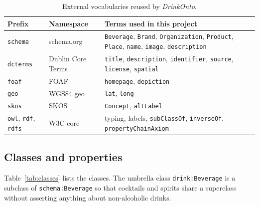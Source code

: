 \begin{table}[h]
  \centering
  \small
  \begin{tabular}{@{}llp{7.2cm}@{}}
    \toprule
    Prefix & Namespace & Terms used in this project \\
    \midrule
    \texttt{schema} & schema.org & \texttt{Beverage}, \texttt{Brand},
      \texttt{Organization}, \texttt{Product}, \texttt{Place},
      \texttt{name}, \texttt{image}, \texttt{description} \\
    \texttt{dcterms} & Dublin Core Terms & \texttt{title},
      \texttt{description}, \texttt{identifier}, \texttt{source},
      \texttt{license}, \texttt{spatial} \\
    \texttt{foaf} & FOAF & \texttt{homepage}, \texttt{depiction} \\
    \texttt{geo} & WGS84 geo & \texttt{lat}, \texttt{long} \\
    \texttt{skos} & SKOS & \texttt{Concept}, \texttt{altLabel} \\
    \texttt{owl}, \texttt{rdf}, \texttt{rdfs} & W3C core & typing, labels,
      \texttt{subClassOf}, \texttt{inverseOf}, \texttt{propertyChainAxiom} \\
    \bottomrule
  \end{tabular}
  \caption{External vocabularies reused by \emph{DrinkOnto}.}
  \label{tab:reuse}
\end{table}

\subsection{Classes and properties}

Table~\ref{tab:classes} lists the classes. The umbrella class
\texttt{drink:Beverage} is a subclass of \texttt{schema:Beverage} so that
cocktails and spirits share a superclass without asserting anything about
non-alcoholic drinks.

